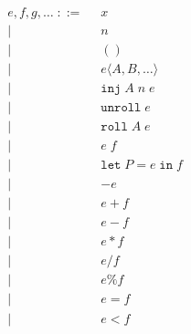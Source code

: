 \documentclass{scrartcl}
\begin{document}
\begin{minipage}[t]{1cm}
  \begin{align*}
    e, f, g, \dots \; ::= \;\;
      & x                                                                                                \\
    | & n                                                                                                \\
    | & ()                                                                                               \\
    | & e \langle A, B, \dots \rangle                                                                    \\
    | & \mathtt{inj}\;A\;n\;e                                                                            \\
    | & \mathtt{unroll}\;e                                                                               \\
    | & \mathtt{roll}\;A\;e                                                                              \\
    | & e\;f                                                                                             \\
    | & \mathtt{let}\;P = e\;\mathtt{in}\;f                                                              \\
    | & -e                                                                                               \\
    | & e + f                                                                                            \\
    | & e - f                                                                                            \\
    | & e * f                                                                                            \\
    | & e / f                                                                                            \\
    | & e \% f                                                                                           \\
    | & e = f                                                                                            \\
    | & e < f                                                                                            \\

\end{align*}
\end{minipage}
\end{document}
